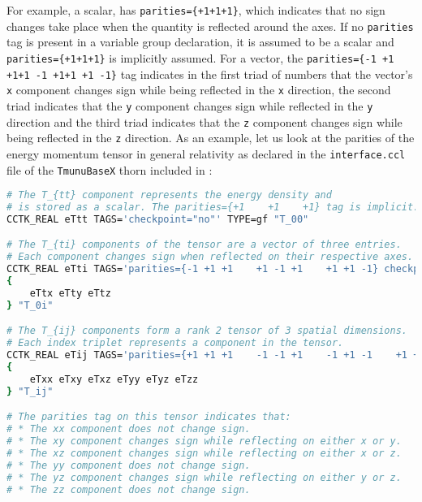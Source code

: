 For example, a scalar, has \texttt{parities=\{+1\hspace{15pt}+1\hspace{15pt}+1\}}, which indicates that no sign changes take place when the quantity is reflected around the axes. If no \texttt{parities} tag is present in a variable group declaration, it is assumed to be a scalar and \texttt{parities=\{+1\hspace{15pt}+1\hspace{15pt}+1\}} is implicitly assumed. For a vector, the \texttt{parities=\{-1 +1 +1\hspace{15pt}+1 -1 +1\hspace{15pt}+1 +1 -1\}} tag indicates in the first triad of numbers that the vector's \texttt{x} component changes sign while being reflected in the \texttt{x} direction, the second triad indicates that the \texttt{y} component changes sign while reflected in the \texttt{y} direction and the third triad indicates that the \texttt{z} component changes sign while being reflected in the \texttt{z} direction. As an example, let us look at the parities of the energy momentum tensor in general relativity as declared in the \texttt{interface.ccl} file of the \texttt{TmunuBaseX} thorn included in \CarpetX\space: 
%
\begin{lstlisting}[language=bash]
# The T_{tt} component represents the energy density and
# is stored as a scalar. The parities={+1    +1    +1} tag is implicit.
CCTK_REAL eTtt TAGS='checkpoint="no"' TYPE=gf "T_00"

# The T_{ti} components of the tensor are a vector of three entries.
# Each component changes sign when reflected on their respective axes.
CCTK_REAL eTti TAGS='parities={-1 +1 +1    +1 -1 +1    +1 +1 -1} checkpoint="no"' TYPE=gf
{ 
    eTtx eTty eTtz
} "T_0i"

# The T_{ij} components form a rank 2 tensor of 3 spatial dimensions.
# Each index triplet represents a component in the tensor.
CCTK_REAL eTij TAGS='parities={+1 +1 +1    -1 -1 +1    -1 +1 -1    +1 +1 +1    +1 -1 -1    +1 +1 +1} checkpoint="no"' TYPE=gf
{
    eTxx eTxy eTxz eTyy eTyz eTzz
} "T_ij"

# The parities tag on this tensor indicates that:
# * The xx component does not change sign.
# * The xy component changes sign while reflecting on either x or y.
# * The xz component changes sign while reflecting on either x or z.
# * The yy component does not change sign.
# * The yz component changes sign while reflecting on either y or z.
# * The zz component does not change sign.
\end{lstlisting}

